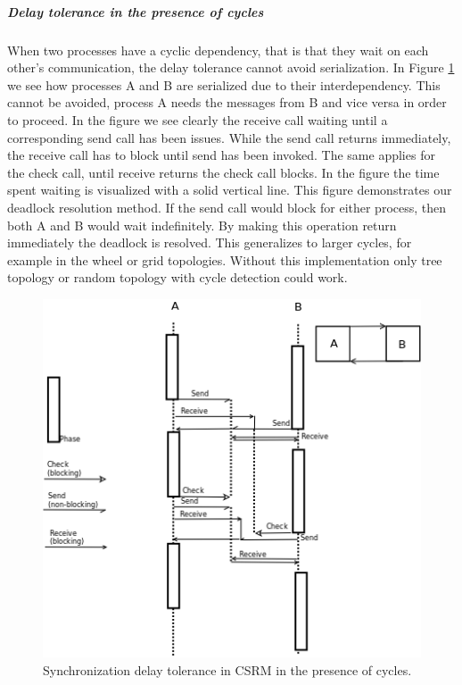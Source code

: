\subparagraph{Delay tolerance in the presence of cycles}
When two processes have a cyclic dependency, that is that they wait on each other's communication, the delay tolerance cannot avoid serialization. In Figure \ref{fig:delaycyclic} we see how processes A and B are serialized due to their interdependency. This cannot be avoided, process A needs the messages from B and vice versa in order to proceed. In the figure we see clearly the receive call waiting until a corresponding send call has been issues. While the send call returns immediately, the receive call has to block until send has been invoked. The same applies for the check call, until receive returns the check call blocks. In the figure the time spent waiting is visualized with a solid vertical line. 
This figure demonstrates our deadlock resolution method. If the send call would block for either process, then both A and B would wait indefinitely. By making this operation return immediately the deadlock is resolved. This generalizes to larger cycles, for example in the wheel or grid topologies. Without this implementation only tree topology or random topology with cycle detection could work.
\begin{figure}
    \centering
    \includegraphics[width=\textwidth,height=\textheight,keepaspectratio]{figures/delaycycle.png}
    \caption{Synchronization delay tolerance in CSRM in the presence of cycles.}
    \label{fig:delaycyclic}
\end{figure}

